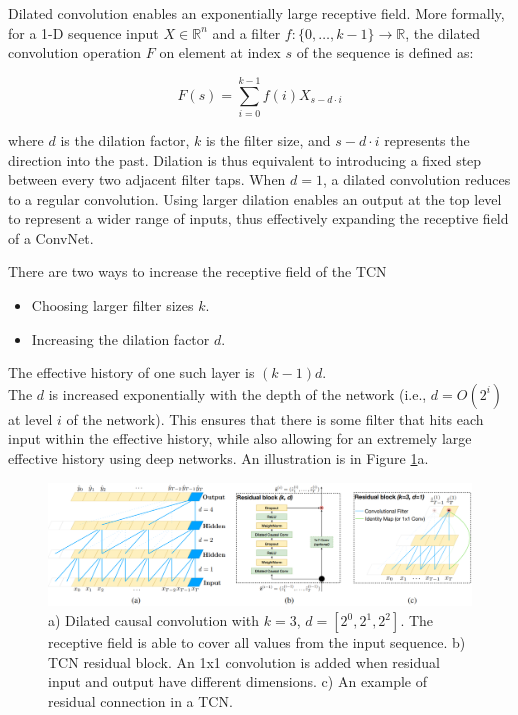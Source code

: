 \documentclass[12pt, titlepage]{article}
\begin{document}
Dilated convolution enables an exponentially large receptive field. More formally, for a 1-D sequence input $X \in \mathbb{R}^n$ and a filter $f:\{0, \dots , k - 1\} \rightarrow \mathbb{R}$, the dilated convolution operation $F$ on element at index $s$ of the sequence is defined as:

\begin{equation}
F(s) = \sum_{i=0}^{k-1}{f(i)X_{s - d \cdot i}}
\end{equation}

where $d$ is the dilation factor, $k$ is the filter size, and $s - d \cdot i$ represents the direction into the past. Dilation is thus equivalent to introducing a fixed step between every two adjacent filter taps. When $d=1$, a dilated convolution reduces to a regular convolution. Using larger dilation enables an output at the top level to represent a wider range of inputs, thus effectively expanding the receptive field of a ConvNet.

There are two ways to increase the receptive field of the TCN
\begin{itemize}
\item Choosing larger filter sizes $k$.
\item Increasing the dilation factor $d$.
\end{itemize}
The effective history of one such layer is
$(k - 1)d$. \\

The $d$ is increased exponentially with the depth of the network (i.e., $d = O(2^i)$ at level $i$ of the network). This ensures that there is some filter that hits each input within the effective history, while also allowing for an extremely large effective history using deep networks. An illustration is in Figure \ref{fig:diagrams}a.

\begin{figure}[h!]
\includegraphics[width=1.0\textwidth]{../img/diagrams}
\caption{a) Dilated causal convolution with $k=3$, $d=[2^0, 2^1, 2^2]$. The receptive field is able to cover all values from the input sequence. b) TCN residual block. An 1x1 convolution is added when residual input and output have different dimensions. c) An example of residual connection in a TCN.}
\label{fig:diagrams}
\end{figure}
\end{document}

